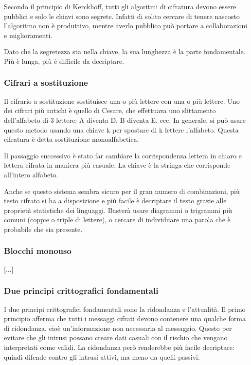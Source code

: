 Secondo il principio di Kerckhoff, tutti gli algoritmi di cifratura devono essere pubblici e solo le chiavi sono segrete.
Infatti di solito cercare di tenere nascosto l'algoritmo non è produttivo, mentre averlo pubblico può portare a collaborazioni e miglioramenti.

Dato che la segretezza sta nella chiave, la sua lunghezza è la parte fondamentale.
Più è lunga, più è difficile da decriptare.

\subsubsection{Cifrari a sostituzione}
Il cifrario a sostituzione sostituisce una o più lettere con una o più lettere.
Uno dei cifrari più antichi è quello di Cesare, che effettuava uno slittamento dell'alfabeto di 3 lettere: A diventa D, B diventa E, ecc.
In generale, si può usare questo metodo usando una chiave k per spostare di k lettere l'alfabeto.
Questa cifratura è detta sostituzione monoalfabetica.

Il passaggio successivo è stato far cambiare la corrispondenza lettera in chiaro e lettera cifrata in maniera più casuale.
La chiave è la stringa che corrisponde all'intero alfabeto.

Anche se questo sistema sembra sicuro per il gran numero di combinazioni, 
più testo cifrato si ha a disposizione e più facile è decriptare il testo grazie alle proprietà statistiche dei linguaggi.
Basterà usare diagrammi o trigrammi più comuni (coppie o triple di lettere), o cercare di individuare una parola che è probabile che sia presente.

\subsubsection{Blocchi monouso}
[...]

\subsubsection{Due principi crittografici fondamentali}
I due principi crittografici fondamentali sono la ridondanza e l'attualità.
Il primo principio afferma che tutti i messaggi cifrati devono contenere una qualche forma di ridondanza, cioè un'informazione non necessaria al messaggio.
Questo per evitare che gli intrusi possano creare dati casuali con il rischio che vengano interpretati come validi.
La ridondanza però renderebbe più facile decriptare: quindi difende contro gli intrusi attivi, ma meno da quelli passivi. 

